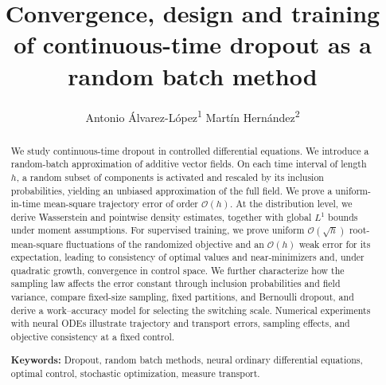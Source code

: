 \documentclass[twoside,11pt]{article}
\title{Convergence, design and training of continuous-time dropout as a random batch method}
\author{
Antonio Álvarez-López\textsuperscript{1} \qquad
Martín Hernández\textsuperscript{2}
}
\date{\vspace{-1cm}}
\theoremstyle{plain}
\begin{document}
\maketitle



\begingroup
\renewcommand\thefootnote{}
\addtocounter{footnote}{-1}
\endgroup


\renewcommand{\thefootnote}{\fnsymbol{footnote}}
\renewcommand{\thefootnote}{\arabic{footnote}}


\begin{abstract}
We study continuous-time dropout in controlled differential equations. We introduce a random-batch approximation of additive vector fields. On each time interval of length $h$, a random subset of components is activated and rescaled by its inclusion probabilities, yielding an unbiased approximation of the full field. We prove a uniform-in-time mean-square trajectory error of order $\mathcal O(h)$. At the distribution level, we derive Wasserstein and pointwise density estimates, together with global $L^1$ bounds under moment assumptions. For supervised training, we prove uniform $\mathcal O(\sqrt h)$ root-mean-square fluctuations of the randomized objective and an $\mathcal O(h)$ weak error for its expectation, leading to consistency of optimal values and near-minimizers and, under quadratic growth, convergence in control space. We further characterize how the sampling law affects the error constant through inclusion probabilities and field variance, compare fixed-size sampling, fixed partitions, and Bernoulli dropout, and derive a work--accuracy model for selecting the switching scale. Numerical experiments with neural ODEs illustrate trajectory and transport errors, sampling effects, and objective consistency at a fixed control.

\vspace{0.3cm}
\noindent \textbf{Keywords:} Dropout, random batch methods, neural ordinary differential equations, optimal control, stochastic optimization, measure transport.
\end{abstract}
\end{document}

